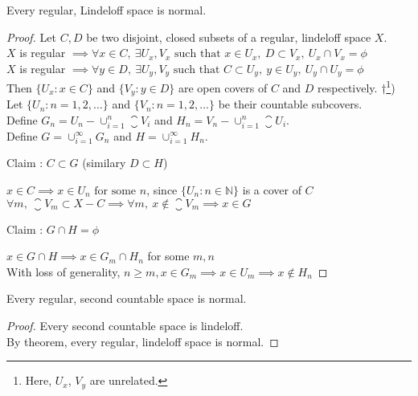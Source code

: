 \begin{theorem}
	Every regular, Lindeloff space is normal.
\end{theorem}
\begin{proof}
	Let $C,D$ be two disjoint, closed subsets of a regular, lindeloff space $X$.\\
	$X$ is regular $\implies \forall x \in C,\ \exists U_x, V_x \text{ such that } x \in U_x,\ D \subset V_x,\ U_x \cap V_x = \phi$\\
	$X$ is regular $\implies \forall y \in D,\ \exists U_y, V_y \text{ such that } C \subset U_y,\ y \in U_y,\ U_y \cap U_y = \phi$\\
	Then $\{ U_x : x \in C \}$ and $\{ V_y : y \in D \}$ are open covers of $C$ and $D$ respectively.
	$\dag$\footnote{Here, $U_x$, $V_y$ are unrelated.})\\
	Let $\{ U_n : n = 1,2,\dotsc \}$ and $\{ V_n : n = 1,2,\dotsc \}$ be their countable subcovers.\\
	Define $G_n = U_n - \cup_{i = 1}^n \closure{V_i}$ and $H_n = V_n - \cup_{i = 1}^n \closure{U_i}$.\\
	Define $G = \cup_{i = 1}^\infty G_n$ and $H = \cup_{i = 1}^\infty H_n$.\\
	\begin{important}
	Claim : $C \subset G$ (similary $D \subset H$)\\
	\end{important}
	$ x \in C \implies x \in U_n \text{ for some } n$, since $\{ U_n : n \in \mathbb{N} \}$ is a cover of $C$\\
	$\forall m,\ \closure{V_m} \subset X-C \implies \forall m,\ x \not\in \closure{V_m} \implies x \in G$\\
	\begin{important}
	Claim : $G \cap H = \phi$\\
	\end{important}
	$x \in G \cap H \implies x \in G_m \cap H_n$ for some $m,n$\\
	With loss of generality, $n \ge m, x \in G_m \implies x \in U_m \implies x \not\in H_n$
\end{proof}

\begin{corollary}
	Every regular, second countable space is normal.
\end{corollary}
\begin{proof}
	Every second countable space is lindeloff.\\
	By theorem, every regular, lindeloff space is normal.
\end{proof}


